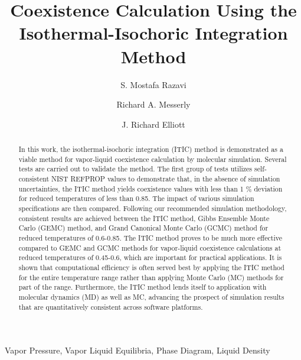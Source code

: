\documentclass[5p,times]{elsarticle}
\begin{document}
\begin{frontmatter}

\title{Coexistence Calculation Using the Isothermal-Isochoric Integration Method}

\author{S. Mostafa Razavi}
\address{Department of Chemical and Biomolecular Engineering, The University of Akron, Akron, Ohio 44325, USA}

\author{Richard A. Messerly}
\address{Thermodynamics Research Center, National Institute of Standards and Technology, Boulder, Colorado 80305, USA}

\author{J. Richard Elliott }
\address{Department of Chemical and Biomolecular Engineering, The University of Akron, Akron, Ohio 44325, USA}

\begin{abstract}
In this work, the isothermal-isochoric integration (ITIC) method is demonstrated as a viable method for vapor-liquid coexistence calculation by molecular simulation. Several tests are carried out to validate the method. The first group of tests utilizes self-consistent NIST REFPROP values to demonstrate that, in the absence of simulation uncertainties, the ITIC method yields coexistence values with less than 1 \% deviation for reduced temperatures of less than 0.85. The impact of various simulation specifications are then compared. Following our recommended simulation methodology, consistent results are achieved between the ITIC method, Gibbs Ensemble Monte Carlo (GEMC) method, and Grand Canonical Monte Carlo (GCMC) method for reduced temperatures of 0.6-0.85. The ITIC method proves to be much more effective compared to GEMC and GCMC methods for vapor-liquid coexistence calculations at reduced temperatures of 0.45-0.6, which are important for practical applications. It is shown that computational efficiency is often served best by applying the ITIC method for the entire temperature range rather than applying Monte Carlo (MC) methods for part of the range. Furthermore, the ITIC method lends itself to application with molecular dynamics (MD) as well as MC, advancing the prospect of simulation results that are quantitatively consistent across software platforms.
\end{abstract}

\begin{keyword}
Vapor Pressure, Vapor Liquid Equilibria, Phase Diagram, Liquid Density
\end{keyword}

\end{frontmatter}
\end{document}
